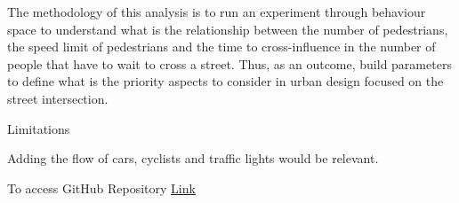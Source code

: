 \documentclass[10pt]{report}
\numberwithin{figure}{section}
\numberwithin{table}{section}
\begin{document}
The methodology of this analysis is to run an experiment through behaviour space to understand what is the relationship between the number of pedestrians, the speed limit of pedestrians and the time to cross-influence in the number of people that have to wait to cross a street. Thus, as an outcome, build parameters to define what is the priority aspects to consider in urban design focused on the street intersection.



Limitations

Adding the flow of cars, cyclists and traffic lights would be relevant.

















\newpage
\printbibliography[title = {References}]

\vspace{5mm} %

To access GitHub Repository \href{https://github.com/brfelipealmeida/ABM_coursework}{Link}
\end{document}
